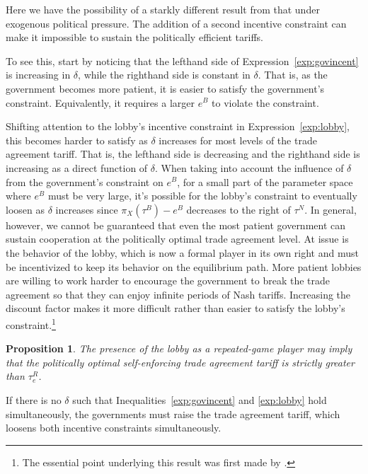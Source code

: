 \documentclass[12pt,titlepage]{article}
\newtheorem{proposition}{Proposition}
\newcommand{\de}{\delta}
\begin{document}
Here we have the possibility of a starkly different result from that under exogenous political pressure. The addition of a second incentive constraint can make it impossible to sustain the politically efficient tariffs.

To see this, start by noticing that the lefthand side of Expression~\ref{exp:govincent} is increasing in $\de$, while the righthand side is constant in $\de$. That is, as the government becomes more patient, it is easier to satisfy the government's constraint. Equivalently, it requires a larger $e^B$ to violate the constraint.

Shifting attention to the lobby's incentive constraint in Expression~\ref{exp:lobby}, this becomes harder to satisfy as $\de$ increases for most levels of the trade agreement tariff. That is, the lefthand side is decreasing and the righthand side is increasing as a direct function of $\de$. When taking into account the influence of $\de$ from the government's constraint on $e^B$, for a small part of the parameter space where $e^B$ must be very large, it's possible for the lobby's constraint to eventually loosen as $\de$ increases since $\pi_X(\tau^B) - e^B$ decreases to the right of $\tau^N$. In general, however, we cannot be guaranteed that even the most patient government can sustain cooperation at the politically optimal trade agreement level. At issue is the behavior of the lobby, which is now a formal player in its own right and must be incentivized to keep its behavior on the equilibrium path. More patient lobbies are willing to work harder to encourage the government to break the trade agreement so that they can enjoy infinite periods of Nash tariffs. Increasing the discount factor makes it more difficult rather than easier to satisfy the lobby's constraint.\footnote{The essential point underlying this result was first made by \Textcite{buzard2013a}.}

\begin{proposition}
  The presence of the lobby as a repeated-game player may imply that the politically optimal self-enforcing trade agreement tariff is strictly greater than $\tau_e^R$.
	\label{res:repeated}
\end{proposition}

If there is no $\de$ such that Inequalities~\ref{exp:govincent} and \ref{exp:lobby} hold simultaneously, the governments must raise the trade agreement tariff, which loosens both incentive constraints simultaneously.
\end{document}
